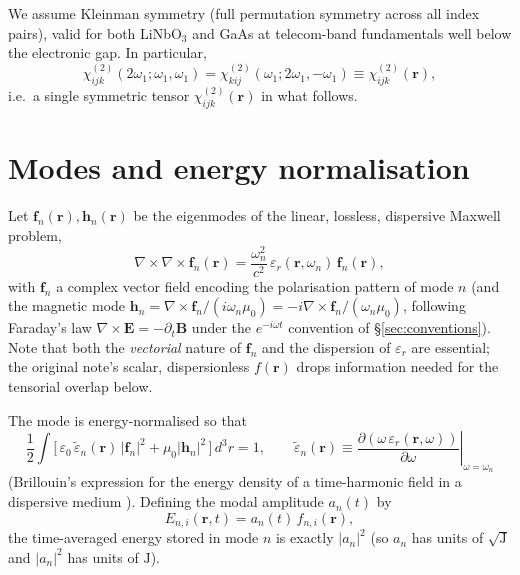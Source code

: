 \documentclass[11pt,a4paper]{article}
\newcommand{\eps}{\varepsilon}
\newcommand{\epstilde}{\widetilde{\varepsilon}}
\newcommand{\bvec}[1]{\mathbf{#1}}
\newcommand{\E}{\bvec{E}}
\newcommand{\f}{\bvec{f}}
\newcommand{\h}{\bvec{h}}
\newcommand{\ri}{\bvec{r}}
\newcommand{\dthreer}{\,d^{3}r}
\newcommand{\chitwo}{\chi^{(2)}}
\begin{document}
We assume Kleinman symmetry (full permutation symmetry across all index
pairs), valid for both LiNbO$_3$ and GaAs at telecom-band fundamentals
well below the electronic gap.  In particular,
\begin{equation}
  \chitwo_{ijk}(2\omega_1;\omega_1,\omega_1)=\chitwo_{kij}(\omega_1;2\omega_1,-\omega_1)\equiv\chitwo_{ijk}(\ri),
\end{equation}
i.e.\ a single symmetric tensor $\chitwo_{ijk}(\ri)$ in what follows.

\section{Modes and energy normalisation}

Let $\f_n(\ri),\h_n(\ri)$ be the eigenmodes of the linear, lossless,
dispersive Maxwell problem,
\begin{equation}
  \nabla\!\times\!\nabla\!\times\!\f_n(\ri)
  =\frac{\omega_n^2}{c^2}\,\eps_r(\ri,\omega_n)\,\f_n(\ri),
\end{equation}
with $\f_n$ a complex vector field encoding the polarisation pattern of
mode $n$ (and the magnetic mode
$\h_n=\nabla\!\times\!\f_n/(i\omega_n\mu_0)=-i\nabla\!\times\!\f_n/(\omega_n\mu_0)$,
following Faraday's law $\nabla\!\times\!\E=-\partial_t\mathbf B$ under the
$e^{-i\omega t}$ convention of \S\ref{sec:conventions}).
Note that both the \emph{vectorial} nature of $\f_n$ and the dispersion
of $\eps_r$ are essential; the original note's scalar, dispersionless
$f(\ri)$ drops information needed for the tensorial overlap below.

The mode is energy-normalised so that
\begin{equation}
  \boxed{\;\frac12\!\int\!\!\bigl[\,\eps_0\,\epstilde_n(\ri)\,|\f_n|^2+\mu_0|\h_n|^2\,\bigr]\dthreer=1,
  \qquad
  \epstilde_n(\ri)\equiv\left.\frac{\partial(\omega\,\eps_r(\ri,\omega))}{\partial\omega}\right|_{\omega=\omega_n}\;}
\label{eq:Brillouin}
\end{equation}
(Brillouin's expression for the energy density of a time-harmonic field
in a dispersive medium \cite[\S 80]{LandauLifshitz}).  Defining the
modal amplitude $a_n(t)$ by
\begin{equation}
  E_{n,i}(\ri,t)=a_n(t)\,f_{n,i}(\ri),
\end{equation}
the time-averaged energy stored in mode $n$ is exactly $|a_n|^2$
(so $a_n$ has units of $\sqrt{\mathrm J}$ and $|a_n|^2$ has units of $\mathrm J$).
\end{document}
